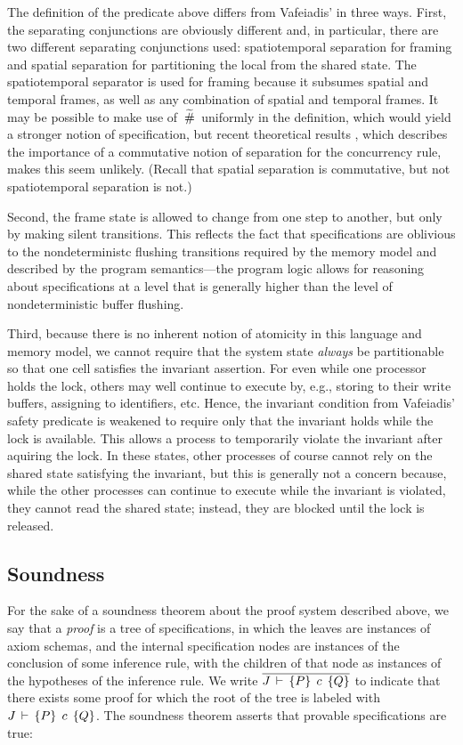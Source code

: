\documentclass[11pt]{report}
\begin{document}
The definition of the predicate above differs from Vafeiadis' in three ways. First, the separating conjunctions are obviously different and, in particular, there are two different separating conjunctions used: spatiotemporal separation for framing and spatial separation for partitioning the local from the shared state. The spatiotemporal separator is used for framing because it subsumes spatial and temporal frames, as well as any combination of spatial and temporal frames. It may be possible to make use of $\operatorname{\,\widetilde{\#}\,}$ uniformly in the definition, which would yield a stronger notion of specification, but recent theoretical results \cite{DBLP:conf/concur/HoareHMOPS11}, which describes the importance of a commutative notion of separation for the concurrency rule, makes this seem unlikely. (Recall that spatial separation is commutative, but not spatiotemporal separation is not.)

Second, the frame state is allowed to change from one step to another, but only by making silent transitions. This reflects the fact that specifications are oblivious to the nondeterministc flushing transitions required by the memory model and described by the program semantics---the program logic allows for reasoning about specifications at a level that is generally higher than the level of nondeterministic buffer flushing. 

Third, because there is no inherent notion of atomicity in this language and memory model, we cannot require that the system state \emph{always} be partitionable so that one cell satisfies the invariant assertion. For even while one processor holds the lock, others may well continue to execute by, e.g., storing to their write buffers, assigning to identifiers, etc. Hence, the invariant condition from Vafeiadis' safety predicate is weakened to require only that the invariant holds while the lock is available. This allows a process to  temporarily violate the invariant after aquiring the lock. In these states, other processes of course cannot rely on the shared state satisfying the invariant, but this is generally not a concern because, while the other processes can continue to execute while the invariant is violated, they cannot read the shared state; instead, they are blocked until the lock is released. 


\subsection{Soundness}

For the sake of a soundness theorem about the proof system described above, we say that a \emph{proof} is a tree of specifications, in which the leaves are instances of axiom schemas, and the internal specification nodes are instances of the conclusion of some inference rule, with the children of that node as instances of the hypotheses of the inference rule. We write $\overline{J\,\vdash\,\left\lbrace P \right\rbrace\;c\;\left\lbrace Q \right\rbrace}$ to indicate that there exists some proof for which the root of the tree is labeled with $J\,\vdash\,\left\lbrace P \right\rbrace\;c\;\left\lbrace Q \right\rbrace$. The soundness theorem asserts that provable specifications are true: 
\end{document}
